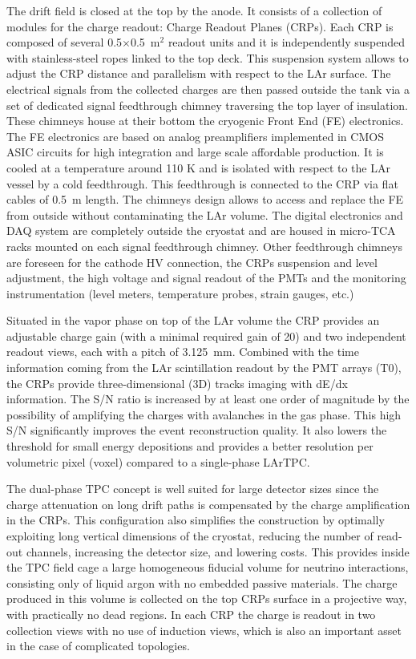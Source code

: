 The drift field is closed at the top by the anode. It consists of a
collection of modules for the charge readout: Charge Readout Planes
(CRPs). Each CRP is composed of several 0.5$\times$0.5~m$^2$ readout
units and it is independently suspended with stainless-steel ropes
linked to the top deck. This suspension system allows to adjust the
CRP distance and parallelism with respect to the LAr surface. The
electrical signals from the collected charges are then passed outside
the tank via a set of dedicated signal feedthrough chimney traversing
the top layer of insulation. These chimneys house at their bottom the
cryogenic Front End (FE) electronics.  The FE electronics are based on
analog preamplifiers implemented in CMOS ASIC circuits for high
integration and large scale affordable production. It is cooled at a
temperature around 110 K and is isolated with respect to the LAr
vessel by a cold feedthrough. This feedthrough is connected to the CRP
via flat cables of 0.5~m length. The chimneys design allows to access
and replace the FE from outside without contaminating the LAr
volume. The digital electronics and DAQ system are completely outside
the cryostat and are housed in micro-TCA racks mounted on each signal
feedthrough chimney. Other feedthrough chimneys are foreseen for the
cathode HV connection, the CRPs suspension and level adjustment, the
high voltage and signal readout of the PMTs and the monitoring
instrumentation (level meters, temperature probes, strain gauges,
etc.)

Situated in the vapor phase on top of the LAr volume the CRP provides
an adjustable charge gain (with a minimal required gain of 20) and two
independent readout views, each with a pitch of 3.125~mm.  Combined
with the time information coming from the LAr scintillation readout by
the PMT arrays (T0), the CRPs provide three-dimensional (3D) tracks
imaging with dE/dx information. The S/N ratio is increased by at least
one order of magnitude by the possibility of amplifying the charges
with avalanches in the gas phase.  This high S/N significantly
improves the event reconstruction quality. It also lowers the
threshold for small energy depositions and provides a better
resolution per volumetric pixel (voxel) compared to a 
single-phase LArTPC.

The dual-phase TPC concept is well suited for large detector sizes
since the charge attenuation on long drift paths is compensated by the
charge amplification in the CRPs.  This configuration also simplifies
the construction by optimally exploiting long vertical dimensions of
the cryostat, reducing the number of read-out channels, increasing the
detector size, and lowering costs.  This provides inside the TPC field
cage a large homogeneous fiducial volume for neutrino interactions,
consisting only of liquid argon with no embedded passive
materials. The charge produced in this volume is collected on the top
CRPs surface in a projective way, with practically no dead regions. In
each CRP the charge is readout in two collection views with no use of
induction views, which is also an important asset in the case of
complicated topologies.

